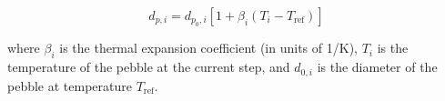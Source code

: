 \begin{equation}
	d_{p,i} = d_{p_0,i}\left[1+\beta_i\left(T_i - T_\text{ref}\right)\right]
\end{equation}

where $\beta_i$ is the thermal expansion coefficient (in units of \si{1/K}), $T_i$ is the temperature of the pebble at the current step, and $d_{0,i}$ is the diameter of the pebble at temperature $T_\text{ref}$.

